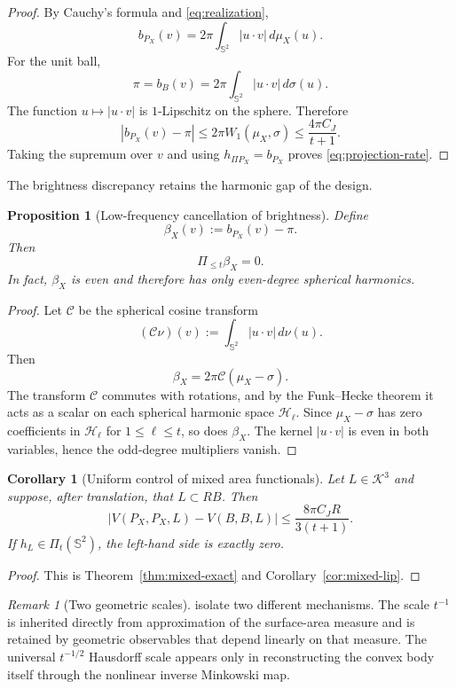 \documentclass[11pt]{article}
\newtheorem{proposition}[theorem]{Proposition}
\newtheorem{corollary}[theorem]{Corollary}
\theoremstyle{definition}
\theoremstyle{remark}
\newtheorem{remark}[theorem]{Remark}
\newcommand{\Sph}{\mathbb S}
\newcommand{\K}{\mathcal K}
\newcommand{\Harm}{\mathcal H}
\begin{document}
\begin{proof}
By Cauchy's formula and \eqref{eq:realization},
\[
b_{P_X}(v)=2\pi\int_{\Sph^2}|u\cdot v|\,d\mu_X(u).
\]
For the unit ball,
\[
\pi=b_B(v)=2\pi\int_{\Sph^2}|u\cdot v|\,d\sigma(u).
\]
The function $u\mapsto|u\cdot v|$ is $1$-Lipschitz on the sphere. Therefore
\[
|b_{P_X}(v)-\pi|
\le2\pi W_1(\mu_X,\sigma)
\le\frac{4\pi C_J}{t+1}.
\]
Taking the supremum over $v$ and using $h_{\Pi P_X}=b_{P_X}$ proves \eqref{eq:projection-rate}.
\end{proof}

The brightness discrepancy retains the harmonic gap of the design.

\begin{proposition}[Low-frequency cancellation of brightness]\label{prop:brightness-gap}
Define
\[
\beta_X(v):=b_{P_X}(v)-\pi.
\]
Then
\begin{equation}\label{eq:brightness-gap}
\Pi_{\le t}\beta_X=0.
\end{equation}
In fact, $\beta_X$ is even and therefore has only even-degree spherical harmonics.
\end{proposition}

\begin{proof}
Let $\mathcal C$ be the spherical cosine transform
\[
(\mathcal C\nu)(v):=\int_{\Sph^2}|u\cdot v|\,d\nu(u).
\]
Then
\[
\beta_X=2\pi\mathcal C(\mu_X-\sigma).
\]
The transform $\mathcal C$ commutes with rotations, and by the Funk--Hecke theorem it acts as a scalar on each spherical harmonic space $\Harm_\ell$. Since $\mu_X-\sigma$ has zero coefficients in $\Harm_\ell$ for $1\le\ell\le t$, so does $\beta_X$. The kernel $|u\cdot v|$ is even in both variables, hence the odd-degree multipliers vanish.
\end{proof}

\begin{corollary}[Uniform control of mixed area functionals]\label{cor:mixed-area}
Let $L\in\K^3$ and suppose, after translation, that $L\subset RB$. Then
\[
|V(P_X,P_X,L)-V(B,B,L)|\le\frac{8\pi C_JR}{3(t+1)}.
\]
If $h_L\in\Pi_t(\Sph^2)$, the left-hand side is exactly zero.
\end{corollary}

\begin{proof}
This is Theorem~\ref{thm:mixed-exact} and Corollary~\ref{cor:mixed-lip}.
\end{proof}

\begin{remark}[Two geometric scales]\label{rem:two-scales}
 isolate two different mechanisms. The scale $t^{-1}$ is inherited directly from approximation of the surface-area measure and is retained by geometric observables that depend linearly on that measure. The universal $t^{-1/2}$ Hausdorff scale appears only in reconstructing the convex body itself through the nonlinear inverse Minkowski map.
\end{remark}
\end{document}
